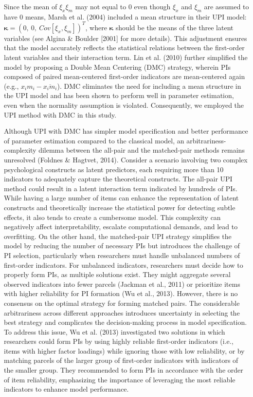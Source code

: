 \documentclass[
  man,mask]{apa6}
\begin{document}
Since the mean of \(\xi_{x}\xi_{m}\) may not equal to 0 even though \(\xi_{x}\) and \(\xi_{m}\) are assumed to have 0 means, Marsh et al. (2004) included a mean structure in their UPI model: \(\mathbf{\kappa} = (0,\ 0,\ Cov[\xi_{x}, \xi_{m}])^T\), where \(\mathbf{\kappa}\) should be the means of the three latent variables (see Algina \& Boulder {[}2001{]} for more details). This adjustment ensures that the model accurately reflects the statistical relations between the first-order latent variables and their interaction term. Lin et al. (2010) further simplified the model by proposing a Double Mean Centering (DMC) strategy, wherein PIs composed of paired mean-centered first-order indicators are mean-centered again (e.g., \(x_{i}m_{i} - \overline{x_{i}m_{i}}\)). DMC eliminates the need for including a mean structure in the UPI model and has been shown to perform well in parameter estimation, even when the normality assumption is violated. Consequently, we employed the UPI method with DMC in this study.

Although UPI with DMC has simpler model specification and better performance of parameter estimation compared to the classical model, an arbitrariness-complexity dilemma between the all-pair and the matched-pair methods remains unresolved (Foldnes \& Hagtvet, 2014). Consider a scenario involving two complex psychological constructs as latent predictors, each requiring more than 10 indicators to adequately capture the theoretical constructs. The all-pair UPI method could result in a latent interaction term indicated by hundreds of PIs. While having a large number of items can enhance the representation of latent constructs and theoretically increase the statistical power for detecting subtle effects, it also tends to create a cumbersome model. This complexity can negatively affect interpretability, escalate computational demands, and lead to overfitting. On the other hand, the matched-pair UPI strategy simplifies the model by reducing the number of necessary PIs but introduces the challenge of PI selection, particularly when researchers must handle unbalanced numbers of first-order indicators. For unbalanced indicators, researchers must decide how to properly form PIs, as multiple solutions exist. They might aggregate several observed indicators into fewer parcels (Jackman et al., 2011) or prioritize items with higher reliability for PI formation (Wu et al., 2013). However, there is no consensus on the optimal strategy for forming matched pairs. The considerable arbitrariness across different approaches introduces uncertainty in selecting the best strategy and complicates the decision-making process in model specification. To address this issue, Wu et al. (2013) investigated two solutions in which researchers could form PIs by using highly reliable first-order indicators (i.e., items with higher factor loadings) while ignoring those with low reliability, or by matching parcels of the larger group of first-order indicators with indicators of the smaller group. They recommended to form PIs in accordance with the order of item reliability, emphasizing the importance of leveraging the most reliable indicators to enhance model performance.
\end{document}
